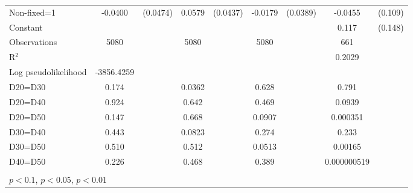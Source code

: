 \begin{tabular}{l|cccccc|cc}
Non-fixed=1     &  -0.0400         & (0.0474)&   0.0579         & (0.0437)&  -0.0179         & (0.0389)&  -0.0455         &  (0.109)\\
Constant        &                  &         &                  &         &                  &         &    0.117         &  (0.148)\\
\hline
Observations    &     5080         &         &     5080         &         &     5080         &         &      661         &         \\
R$^2$      &                  &         &                  &         &                  &         &       0.2029    &   \\ 
Log pseudolikelihood  & -3856.4259   &         &                  &         &                  &         &           &   \\ 
D20=D30         &    0.174         &         &   0.0362         &         &    0.628         &         &    0.791         &         \\
D20=D40         &    0.924         &         &    0.642         &         &    0.469         &         &   0.0939         &         \\
D20=D50         &    0.147         &         &    0.668         &         &   0.0907         &         & 0.000351         &         \\
D30=D40         &    0.443         &         &   0.0823         &         &    0.274         &         &    0.233         &         \\
D30=D50         &    0.510         &         &    0.512         &         &   0.0513         &         &  0.00165         &         \\
D40=D50         &    0.226         &         &    0.468         &         &    0.389         &         &0.000000519         &         \\
\hline\hline
\multicolumn{9}{p{16cm}}{\tiny }\\
\multicolumn{9}{l}{\tiny \sym{*} \(p<0.1\), \sym{**} \(p<0.05\), \sym{***} \(p<0.01\)}\\
\end{tabular}